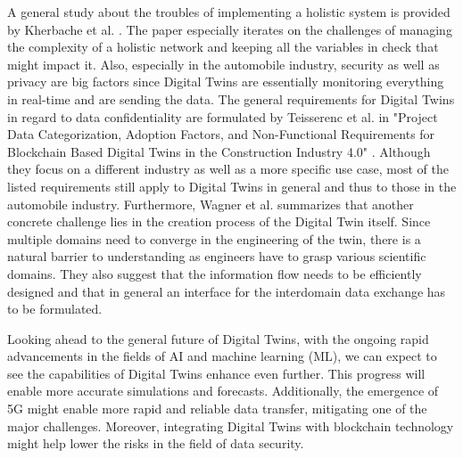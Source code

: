 A general study about the troubles of implementing a holistic system is provided by Kherbache et al. \cite{gomez2021}. The paper especially iterates on the challenges of managing the complexity of a holistic network and keeping all the variables in check that might impact it. Also, especially in the automobile industry, security as well as privacy are big factors since Digital Twins are essentially monitoring everything in real-time and are sending the data. The general requirements for Digital Twins in regard to data confidentiality are formulated by Teisserenc et al. in "Project Data Categorization, Adoption Factors, and Non-Functional Requirements for Blockchain Based Digital Twins in the Construction Industry 4.0" \cite{teisserenc2021project}. Although they focus on a different industry as well as a more specific use case, most of the listed requirements still apply to Digital Twins in general and thus to those in the automobile industry. 
Furthermore, Wagner et al. \cite{wagner2019challenges} summarizes that another concrete challenge lies in the creation process of the Digital Twin itself. Since multiple domains need to converge in the engineering of the twin, there is a natural barrier to understanding as engineers have to grasp various scientific domains. They also suggest that the information flow needs to be efficiently designed and that in general an interface for the interdomain data exchange has to be formulated.

Looking ahead to the general future of Digital Twins, with the ongoing rapid advancements in the fields of AI and machine learning (ML), we can expect to see the capabilities of Digital Twins enhance even further. This progress will enable more accurate simulations and forecasts. Additionally, the emergence of 5G might enable more rapid and reliable data transfer, mitigating one of the major challenges. Moreover, integrating Digital Twins with blockchain technology might help lower the risks in the field of data security.
\



